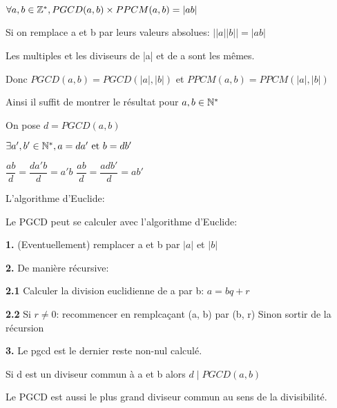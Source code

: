 \documentclass[a4paper, 12pt]{article}
\begin{document}
\begin{proposition}
    $\forall a, b \in \mathbb{Z}^*, PGCD(a, b) \times PPCM(a, b) = |ab|$
\end{proposition}

\begin{demonstration}
    Si on remplace a et b par leurs valeurs absolues: $||a||b|| = |ab|$

    Les multiples et les diviseurs de |a| et de a sont les mêmes.

    Donc $PGCD(a, b) = PGCD(|a|, |b|)$ et $PPCM(a, b) = PPCM(|a|, |b|)$

    Ainsi il suffit de montrer le résultat pour $a, b \in \mathbb{N}^*$

    On pose $d = PGCD(a, b)$

    $\exists a', b' \in \mathbb{N}^*, a = da' \text{ et } b = db'$

    $\dfrac{ab}{d} = \dfrac{da'b}{d} = a'b$
    $\dfrac{ab}{d} = \dfrac{adb'}{d} = ab'$
\end{demonstration}

\begin{methode}
L'algorithme d'Euclide:

Le PGCD peut se calculer avec l'algorithme d'Euclide:

\item \textbf{1.} (Eventuellement) remplacer a et b par $|a|$ et $|b|$
\item \textbf{2.} De manière récursive:
\item \textbf{2.1} Calculer la division euclidienne de a par b: $a = bq + r$
\item \textbf{2.2} Si $r \neq 0$: recommencer en remplcaçant (a, b) par (b, r) Sinon sortir de la récursion
\item \textbf{3.} Le pgcd est le dernier reste non-nul calculé.
\end{methode}

\begin{proposition}
    Si d est un diviseur commun à a et b alors $d \mid PGCD(a, b)$
\end{proposition}

\begin{corollaire}
    Le PGCD est aussi le plus grand diviseur commun au sens de la divisibilité.
\end{corollaire}
\end{document}
